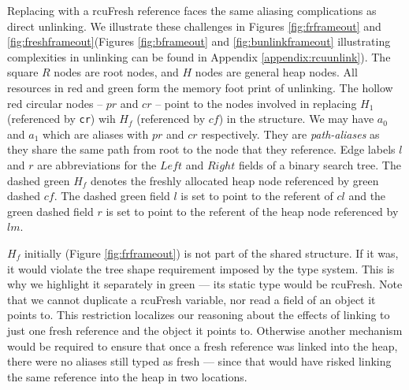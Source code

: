 Replacing with a \textsf{rcuFresh} reference faces the same aliasing complications as direct unlinking.
We illustrate these challenges in Figures \ref{fig:frframeout} and \ref{fig:freshframeout}(Figures \ref{fig:bframeout} and \ref{fig:bunlinkframeout} illustrating complexities in unlinking can be found in Appendix \ref{appendix:rcuunlink}).
The square $R$ nodes are root nodes, and $H$ nodes are general heap nodes.
All resources in red and green form the memory foot print of unlinking. The hollow red circular nodes -- $pr$ and $cr$ -- point to the nodes involved in replacing $H_1$ (referenced by \texttt{cr}) wih $H_f$ (referenced by $cf$) in the structure.
We may have $a_0$ and $a_1$ which are aliases with $pr$ and $cr$ respectively. They are \textit{path-aliases} as they share the same path from root to the node that they reference. 
Edge labels $l$ and $r$ are abbreviations for the $Left$ and $Right$ fields of a binary search tree.
The dashed green $H_f$ denotes the freshly allocated heap node referenced by green dashed  $cf$. The dashed green field $l$ is set to point to the referent of $cl$ and the green dashed field $r$ is set to point to the referent of the heap node referenced by $lm$.

$H_f$ initially (Figure \ref{fig:frframeout}) is not part of the shared structure.  If it was, it would violate the tree shape requirement imposed by the type system.  This is why we highlight it separately in green --- its static type would be \textsf{rcuFresh}.
Note that we cannot duplicate a \textsf{rcuFresh} variable, nor read a field of an object it points to.
This restriction localizes our reasoning about the effects of linking to just one fresh reference and the object it points to.
Otherwise another mechanism would be required to ensure that once a fresh reference was linked into the heap, there were no aliases still typed as fresh --- since that would have risked linking the same reference into the heap in two locations.

